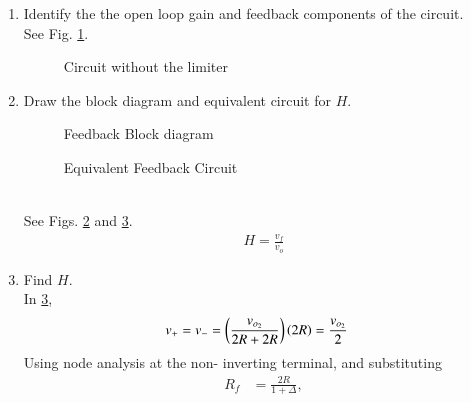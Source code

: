 \begin{enumerate}[label=\arabic*.,ref=\theenumi]
\item Identify the the open loop gain and feedback  components of the circuit.
\\
\solution See Fig. \ref{fig:es17btech11009_b4}.
\begin{figure}[!ht]
	\begin{center}
		\resizebox{\columnwidth}{!}{}
	\end{center}
\caption{Circuit without the limiter}
\label{fig:es17btech11009_b4}
\end{figure}
\item Draw the block diagram and equivalent circuit for $H$.
\renewcommand{\thefigure}{\theenumi.\arabic{figure}}
\begin{figure}[!ht]
	\begin{center}
		\resizebox{\columnwidth}{!}{}
	\end{center}
\caption{Feedback Block diagram}
\label{fig:es17btech11009_b3}
\end{figure}
\begin{figure}[!ht]
	\begin{center}
		\resizebox{\columnwidth}{!}{}
	\end{center}
\caption{Equivalent Feedback Circuit}
\label{fig:es17btech11009_fig3}
\end{figure}
\renewcommand{\thefigure}{\theenumi}
\\
\solution See Figs. \ref{fig:es17btech11009_b3} and \ref{fig:es17btech11009_fig3}.
\begin{align}
    H = \frac{v_{f}}{v_{o}}
\end{align}
\item Find $H$.
\\
\solution In \ref{fig:es17btech11009_fig3},
\begin{align}
v_{+}&= v_{-}=\left(\frac{v_{o_2}}{2R + 2R}\right)\left(2R\right) = \frac{v_{o_2}}{2}
\end{align}
%
Using node analysis at the non- inverting terminal, and substituting 
\begin{align}
R_{f} &= \frac{2R}{1 + \Delta},
\label{eq:es17btech11009_Rf}
\end{align}

\end{enumerate}

